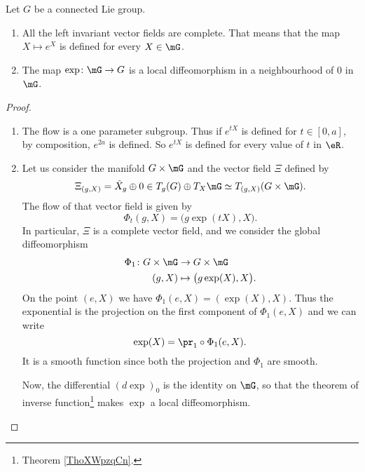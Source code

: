 \begin{proposition}
	Let $G$ be a connected Lie group.
	\begin{enumerate}

		\item
		      All the left invariant vector fields are complete. That means that the map $X\mapsto  e^{X}$ is defined for every $X\in \mG$.
		\item
		      The map $\exp\colon \mG\to G$ is a local diffeomorphism in a neighbourhood of $0$ in $\mG$.
	\end{enumerate}
\end{proposition}

\begin{proof}
	\begin{enumerate}

		\item
		      The flow is a one parameter subgroup. Thus if $ e^{tX}$ is defined for $t\in[0,a]$, by composition, $ e^{2a}$ is defined. So $ e^{tX}$ is defined for every value of $t$ in $\eR$.
		\item
		      Let us consider the manifold $G\times \mG$ and the vector field $\Xi$ defined by
		      \begin{equation}
			      \Xi_{(g,X)}=\tilde X_g\oplus 0\in T_g(G)\oplus T_X\mG\simeq T_{(g,X)}(G\times \mG).
		      \end{equation}
		      The flow of that vector field is given by
		      \begin{equation}
			      \Phi_t(g,X)=\big( g\exp(tX),X \big).
		      \end{equation}
		      In particular, $\Xi$ is a complete vector field, and we consider the global diffeomorphism
		      \begin{equation}
			      \begin{aligned}
				      \Phi_1\colon G\times \mG & \to G\times \mG                 \\
				      (g,X)                    & \mapsto \big( g\exp(X),X \big).
			      \end{aligned}
		      \end{equation}
		      On the point $(e,X)$ we have $\Phi_1(e,X)=(\exp(X),X)$. Thus the exponential is the projection on the first component of $\Phi_1(e,X)$ and we can write
		      \begin{equation}
			      \exp(X)=\pr_1\circ\Phi_1(e,X).
		      \end{equation}
		      It is a smooth function since both the projection and $\Phi_1$ are smooth.

		      Now, the differential $(d\exp)_0$ is the identity on $\mG$, so that the theorem of inverse function\footnote{Theorem \ref{ThoXWpzqCn}.} makes $\exp$ a local diffeomorphism.
	\end{enumerate}
\end{proof}


